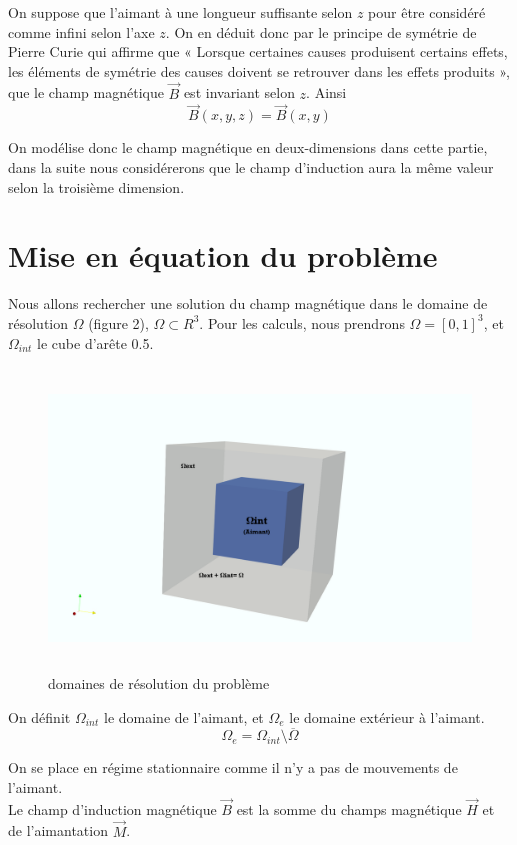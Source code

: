 \documentclass[a4paper,12pt,titlepage]{report}
\begin{document}
\begin{onehalfspace}
On suppose que l'aimant à une longueur suffisante selon $z$ pour être considéré comme infini selon l'axe $z$.
On en déduit donc par le principe de symétrie de Pierre Curie qui affirme que « Lorsque certaines causes produisent certains effets, les éléments de symétrie des causes doivent se retrouver dans les effets produits », que le champ magnétique  $\vec{B}$ est invariant selon $z$.
Ainsi \[\vec{B}(x,y,z) = \vec{B}(x,y)\]

On modélise donc le champ magnétique en deux-dimensions dans cette partie, dans la suite nous considérerons que le champ d'induction aura la même valeur selon la troisième dimension.
\section{Mise en équation du problème}

Nous allons rechercher une solution du champ magnétique dans le domaine de résolution $\Omega$ (figure 2), $\Omega \subset R^{3}$. Pour les calculs, nous prendrons $\Omega = [0,1]^3$, et $\Omega_{int}$ le cube d'arête 0.5.\\
\begin{figure}[h]
\begin{center}
\includegraphics[height = 8cm, keepaspectratio]{graphes/Espacedetravail.png} 
\caption{domaines de résolution du problème}
\label{figure 2}
\end{center}
\end{figure}
On définit $\Omega_{int}$ le domaine de l'aimant, et $\Omega_{e}$ le domaine extérieur à l'aimant. 
\[\Omega_{e} = \Omega_{int} \setminus \overline{\Omega}\]

\newpage
On se place en régime stationnaire comme il n'y a pas de mouvements de l'aimant. \\
Le champ d'induction magnétique $\vec{B}$ est la somme du champs magnétique $\vec{H}$ et de l'aimantation $\vec{M}$.


\end{onehalfspace}
\end{document}
